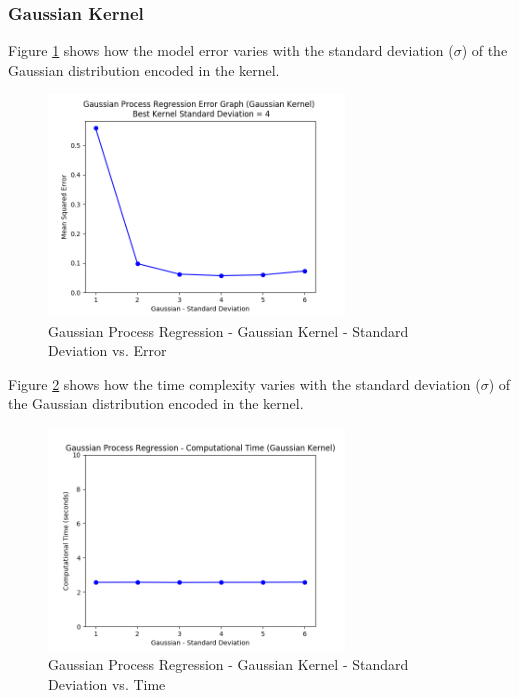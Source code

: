 \documentclass[parskip=full]{scrartcl}
\begin{document}
        \subsubsection*{Gaussian Kernel} %
        \label{ssub:gaussian_kernel}

            Figure \ref{fig:gpr_gaussian_stddev_vs_error} shows how the model error varies with the standard deviation ($\sigma$) of the Gaussian distribution encoded in the kernel.

            \begin{figure}[ht]
                \centering
                \includegraphics[width=0.7\textwidth]{3c_gpr_gaussian_stddev_vs_error.png}
                \caption{Gaussian Process Regression - Gaussian Kernel - Standard Deviation vs. Error}
                \label{fig:gpr_gaussian_stddev_vs_error}
            \end{figure}

            Figure \ref{fig:gpr_gaussian_stddev_vs_time} shows how the time complexity varies with the standard deviation ($\sigma$) of the Gaussian distribution encoded in the kernel.

            \begin{figure}[ht]
                \centering
                \includegraphics[width=0.7\textwidth]{3c_gpr_gaussian_stddev_vs_time.png}
                \caption{Gaussian Process Regression - Gaussian Kernel - Standard Deviation vs. Time}
                \label{fig:gpr_gaussian_stddev_vs_time}
            \end{figure}
        
\end{document}
